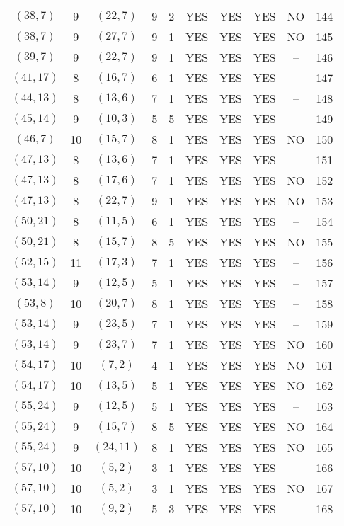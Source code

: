 \begin{longtable}{|c|c|c|c|c|c|c|c|c|c|}
$(38, 7)$ & 9 & $(22, 7)$ & 9 & 2 & YES & YES & YES & NO & 144\\
$(38, 7)$ & 9 & $(27, 7)$ & 9 & 1 & YES & YES & YES & NO & 145\\
$(39, 7)$ & 9 & $(22, 7)$ & 9 & 1 & YES & YES & YES & -- & 146\\
$(41, 17)$ & 8 & $(16, 7)$ & 6 & 1 & YES & YES & YES & -- & 147\\
$(44, 13)$ & 8 & $(13, 6)$ & 7 & 1 & YES & YES & YES & -- & 148\\
$(45, 14)$ & 9 & $(10, 3)$ & 5 & 5 & YES & YES & YES & -- & 149\\
$(46, 7)$ & 10 & $(15, 7)$ & 8 & 1 & YES & YES & YES & NO & 150\\
$(47, 13)$ & 8 & $(13, 6)$ & 7 & 1 & YES & YES & YES & -- & 151\\
$(47, 13)$ & 8 & $(17, 6)$ & 7 & 1 & YES & YES & YES & NO & 152\\
$(47, 13)$ & 8 & $(22, 7)$ & 9 & 1 & YES & YES & YES & NO & 153\\
$(50, 21)$ & 8 & $(11, 5)$ & 6 & 1 & YES & YES & YES & -- & 154\\
$(50, 21)$ & 8 & $(15, 7)$ & 8 & 5 & YES & YES & YES & NO & 155\\
$(52, 15)$ & 11 & $(17, 3)$ & 7 & 1 & YES & YES & YES & -- & 156\\
$(53, 14)$ & 9 & $(12, 5)$ & 5 & 1 & YES & YES & YES & -- & 157\\
$(53, 8)$ & 10 & $(20, 7)$ & 8 & 1 & YES & YES & YES & -- & 158\\
$(53, 14)$ & 9 & $(23, 5)$ & 7 & 1 & YES & YES & YES & -- & 159\\
$(53, 14)$ & 9 & $(23, 7)$ & 7 & 1 & YES & YES & YES & NO & 160\\
$(54, 17)$ & 10 & $(7, 2)$ & 4 & 1 & YES & YES & YES & NO & 161\\
$(54, 17)$ & 10 & $(13, 5)$ & 5 & 1 & YES & YES & YES & NO & 162\\
$(55, 24)$ & 9 & $(12, 5)$ & 5 & 1 & YES & YES & YES & -- & 163\\
$(55, 24)$ & 9 & $(15, 7)$ & 8 & 5 & YES & YES & YES & NO & 164\\
$(55, 24)$ & 9 & $(24, 11)$ & 8 & 1 & YES & YES & YES & NO & 165\\
$(57, 10)$ & 10 & $(5, 2)$ & 3 & 1 & YES & YES & YES & -- & 166\\
$(57, 10)$ & 10 & $(5, 2)$ & 3 & 1 & YES & YES & YES & NO & 167\\
$(57, 10)$ & 10 & $(9, 2)$ & 5 & 3 & YES & YES & YES & -- & 168\\

\end{longtable}
